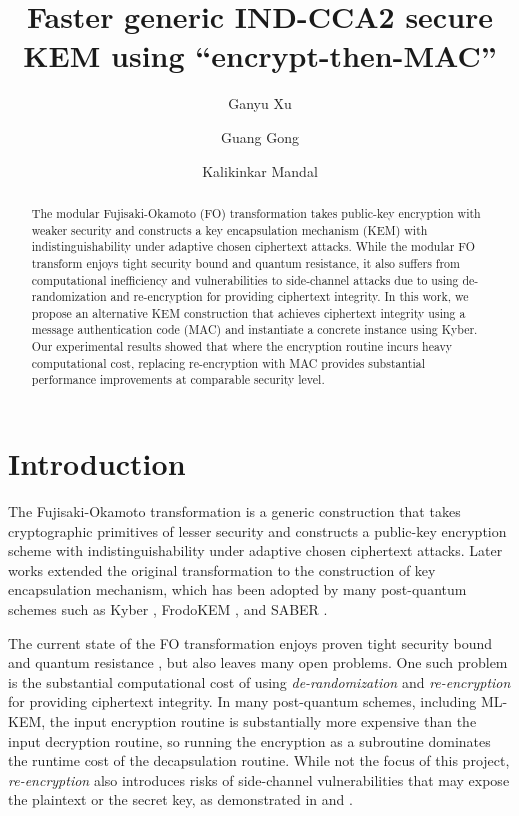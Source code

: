 \documentclass[floatrow,journal=tches,submission]{iacrtrans}
\author{
    Ganyu Xu\inst{1}
    \and Guang Gong\inst{1}
    \and Kalikinkar Mandal\inst{2}
}
\institute{
  University of Waterloo, Waterloo, Canada, \email{{g66xu,ggong}@uwaterloo.ca}
  \and
  University of New Brunswick, New Brunswick, Canada, \email{kmandal@unb.ca}
}
\title{
Faster generic IND-CCA2 secure KEM using ``encrypt-then-MAC''}
\begin{document}
\maketitle




\begin{abstract}
  The modular Fujisaki-Okamoto (FO) transformation takes public-key encryption with weaker security and constructs a key encapsulation mechanism (KEM) with indistinguishability under adaptive chosen ciphertext attacks. While the modular FO transform enjoys tight security bound and quantum resistance, it also suffers from computational inefficiency and vulnerabilities to side-channel attacks due to using de-randomization and re-encryption for providing ciphertext integrity. In this work, we propose an alternative KEM construction that achieves ciphertext integrity using a message authentication code (MAC) and instantiate a concrete instance using Kyber. Our experimental results showed that where the encryption routine incurs heavy computational cost, replacing re-encryption with MAC provides substantial performance improvements at comparable security level.
\end{abstract}


\section{Introduction}
The Fujisaki-Okamoto transformation \cite{fujisaki1999secure} is a generic construction that takes cryptographic primitives of lesser security and constructs a public-key encryption scheme with indistinguishability under adaptive chosen ciphertext attacks. Later works \cite{hofheinz2017modular} extended the original transformation to the construction of key encapsulation mechanism, which has been adopted by many post-quantum schemes such as Kyber \cite{bos2018crystals}, FrodoKEM \cite{bos2016frodo}, and SABER \cite{d2018saber}.

The current state of the FO transformation enjoys proven tight security bound and quantum resistance \cite{hofheinz2017modular}, but also leaves many open problems. One such problem is the substantial computational cost of using \emph{de-randomization} and \emph{re-encryption} \cite{bernstein2018towards} for providing ciphertext integrity. In many post-quantum schemes, including ML-KEM, the input encryption routine is substantially more expensive than the input decryption routine, so running the encryption as a subroutine dominates the runtime cost of the decapsulation routine. While not the focus of this project, \emph{re-encryption} also introduces risks of side-channel vulnerabilities that may expose the plaintext or the secret key, as demonstrated in \cite{ravi2019generic} and \cite{ueno2022curse}.
\end{document}
